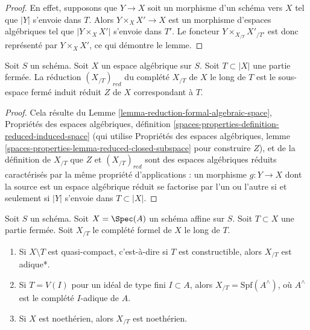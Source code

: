 \begin{proof}
En effet, supposons que $Y \to X$ soit un morphisme d'un schéma vers $X$ tel
que $|Y|$ s'envoie dans $T$. Alors $Y \times_X X' \to X$ est un morphisme
d'espaces algébriques tel que $|Y \times_X X'|$ s'envoie dans $T'$. Le
foncteur $Y \times_{X_{/T}} X'_{/T'}$ est donc représenté par $Y \times_X X'$,
ce qui démontre le lemme.
\end{proof}

\begin{lemma}
\label{lemma-reduction-completion}
Soit $S$ un schéma. Soit $X$ un espace algébrique sur $S$.
Soit $T \subset |X|$ une partie fermée. La réduction $(X_{/T})_{red}$
du complété $X_{/T}$ de $X$ le long de $T$ est
le sous-espace fermé induit réduit $Z$ de $X$ correspondant à $T$.
\end{lemma}

\begin{proof}
Cela résulte du Lemme \ref{lemma-reduction-formal-algebraic-space},
Propriétés des espaces algébriques, définition
\ref{spaces-properties-definition-reduced-induced-space}
(qui utilise Propriétés des espaces algébriques, lemme
\ref{spaces-properties-lemma-reduced-closed-subspace} pour construire $Z$),
et de la définition de $X_{/T}$ que
$Z$ et $(X_{/T})_{red}$ sont des espaces algébriques réduits
caractérisés par la même propriété d'applications :
un morphisme $g : Y \to X$ dont la source est un espace algébrique réduit
se factorise par l'un ou l'autre si et seulement si $|Y|$ s'envoie dans $T \subset |X|$.
\end{proof}

\begin{lemma}
\label{lemma-affine-formal-completion-types}
Soit $S$ un schéma. Soit $X = \Spec(A)$ un schéma affine sur $S$.
Soit $T \subset X$ une partie fermée. Soit $X_{/T}$ le
complété formel de $X$ le long de $T$.
\begin{enumerate}
\item Si $X \setminus T$ est quasi-compact, c'est-à-dire si $T$ est constructible,
alors $X_{/T}$ est adique*.
\item Si $T = V(I)$ pour un idéal de type fini $I \subset A$,
alors $X_{/T} = \text{Spf}(A^\wedge)$, où $A^\wedge$ est le
complété $I$-adique de $A$.
\item Si $X$ est noethérien, alors $X_{/T}$ est noethérien.
\end{enumerate}
\end{lemma}

